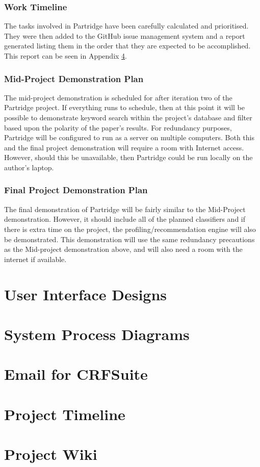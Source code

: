 \documentclass[12pt,a4paper]{article}
\begin{document}
\subsubsection{ Work Timeline }

The tasks involved in Partridge have been carefully calculated and prioritised.
They were then added to the GitHub issue management system and a report
generated listing them in the order that they are expected to be
accomplished. This report can be seen in Appendix \ref{sec:timeline}. 


\subsubsection{ Mid-Project Demonstration Plan}

The mid-project demonstration is scheduled for after iteration two of the
Partridge project. If everything runs to schedule, then at this point it will
be possible to demonstrate keyword search within the project's database and
filter based upon the polarity of the paper's results. For redundancy purposes,
Partridge will be configured to run as a server on multiple computers. Both
this and the final project demonstration will require a room with Internet
access. However, should this be unavailable, then Partridge could be run
locally on the author's laptop.

\subsubsection{ Final Project Demonstration Plan}

The final demonstration of Partridge will be fairly similar to the Mid-Project
demonstration. However, it should include all of the planned classifiers and if
there is extra time on the project, the profiling/recommendation engine will
also be demonstrated. This demonstration will use the same redundancy
precautions as the Mid-project demonstration above, and will also need a room
with the internet if available.

\appendix
\section{User Interface Designs}
\label{sec:ui_designs}

\section{System Process Diagrams}
\label{sec:system_diagrams}

\section{Email for CRFSuite}
\label{sec:crfemail}


\section{Project Timeline}
\label{sec:timeline}

\section{Project Wiki}
\label{sec:wiki}




\end{document}
